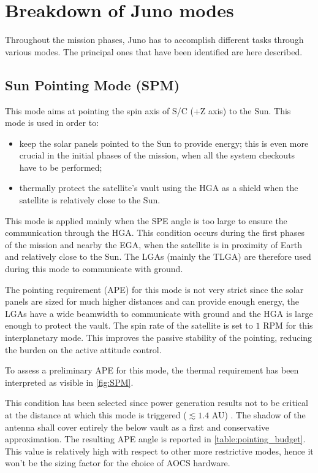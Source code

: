 \section{Breakdown of Juno modes}
\label{sec:AOCS_modes}

Throughout the mission phases, Juno has to accomplish different tasks through various modes. The principal ones that have been identified are here described.

\subsection{Sun Pointing Mode (SPM)}
\label{subsec:sun_pointing_mode}

This mode aims at pointing the spin axis of S/C (+Z axis) to the Sun. This mode is used in order to:
\begin{itemize}
    \item keep the solar panels pointed to the Sun to provide energy; this is even more crucial in the initial phases of the mission, when all the system checkouts have to be performed;
    \item thermally protect the satellite's vault using the HGA as a shield when the satellite is relatively close to the Sun.
\end{itemize}

This mode is applied mainly when the SPE angle is too large to ensure the communication through the HGA. This condition occurs during the first phases of the mission and nearby the EGA, when the satellite is in proximity of Earth and relatively close to the Sun. The LGAs (mainly the TLGA) are therefore used during this mode to communicate with ground.

The pointing requirement (APE) for this mode is not very strict since the solar panels are sized for much higher distances and can provide enough energy, the LGAs have a wide beamwidth to communicate with ground and the HGA is large enough to protect the vault.
The spin rate of the satellite is set to $1$ RPM for this interplanetary mode. This improves the passive stability of the pointing, reducing the burden on the active attitude control.

To assess a preliminary APE for this mode, the thermal requirement has been interpreted as visible in \autoref{fig:SPM}.

This condition has been selected since power generation results not to be critical at the distance at which this mode is triggered ($\lesssim 1.4$ AU) \cite{kurth}.
The shadow of the antenna shall cover entirely the below vault as a first and conservative approximation.
The resulting APE angle is reported in \autoref{table:pointing_budget}.
This value is relatively high with respect to other more restrictive modes, hence it won't be the sizing factor for the choice of AOCS hardware.

